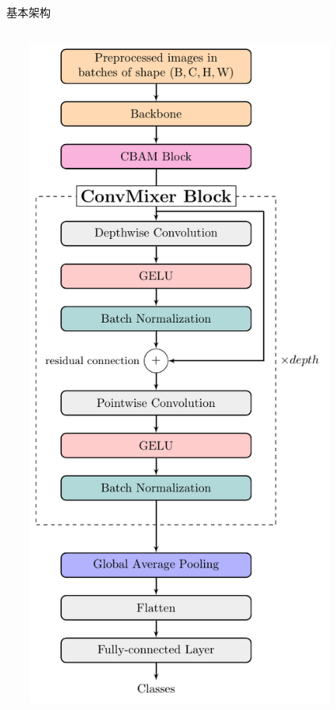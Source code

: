 \documentclass[9pt, aspectratio=1610]{beamer}
\begin{document}
\begin{frame}{基本架构}
\begin{columns}
\begin{column}{0.7\textwidth}
       
    \end{column}
    \begin{column}{0.3\textwidth}
        \begin{center}
         \includegraphics[width=0.8\textwidth]{model.pdf}
         \end{center}
    \end{column}
    \end{columns}
    \end{frame}
\end{document}
